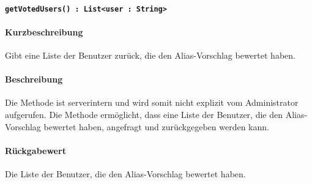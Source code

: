 \paragraph{\texttt{getVotedUsers() : List<user : String>}}%
\paragraph*{Kurzbeschreibung}
Gibt eine Liste der Benutzer zurück, die den Alias-Vorschlag bewertet haben.
\paragraph*{Beschreibung}
Die Methode ist serverintern und wird somit nicht explizit vom Administrator aufgerufen.
Die Methode ermöglicht, dass eine Liste der Benutzer, die den Alias-Vorschlag bewertet haben, angefragt und zurückgegeben werden kann.
\paragraph*{Rückgabewert}
Die Liste der Benutzer, die den Alias-Vorschlag bewertet haben.
